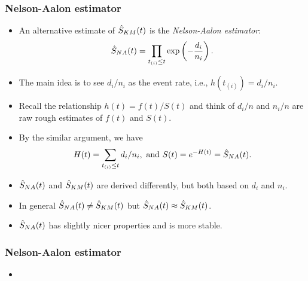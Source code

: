 \documentclass[10pt]{beamer}\usepackage[]{graphicx}\usepackage[]{color}
\newcommand{\empr}[1]{{\emph{\color{red}#1}}}
\newcommand{\Skm}{\hat{S}_{\scriptsize{KM}}}
\newcommand{\Sna}{\hat{S}_{\scriptsize{NA}}}
\begin{document}
\begin{frame}
  \frametitle{Nelson-Aalon estimator}
  \begin{itemize}
  \item An alternative estimate of $\Skm(t)$ is the \empr{Nelson-Aalon estimator}:
    \begin{equation*}
      \Sna(t) = \prod_{t_{(i)} \le t} \exp\left(-\frac{d_i}{n_i}\right).
    \end{equation*}
  \item The main idea is to see $d_i/n_i$ as the event rate, i.e., $h(t_{(i)}) = d_i/n_i$.
  \item Recall the relationship $h(t) = f(t) / S(t)$ and think of $d_i/n$ and $n_i/n$ 
    are raw rough estimates of $f(t)$ and $S(t)$.
  \item By the similar argument, we have
    $$H(t) = \sum_{t_{(i)} \le t} d_i/n_i, \mbox{ and } S(t) = e^{-H(t)} = \Sna(t).$$
  \item $\Sna(t)$ and $\Skm(t)$ are derived differently, but both based on $d_i$ and $n_i$.
  \item In general $\Sna(t)\neq\Skm(t)$ but $\Sna(t)\approx\Skm(t)$.
  \item $\Sna(t)$ has slightly nicer properties and is more stable.
  \end{itemize}
\end{frame}


\begin{frame}[fragile]
  \frametitle{Nelson-Aalon estimator}
  \begin{itemize}
  \item
  \end{itemize}
\end{frame}
\end{document}
